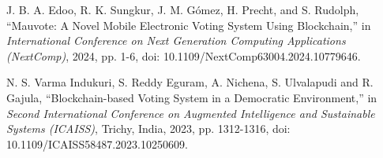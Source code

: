 \documentclass[conference]{IEEEtran}
\begin{document}
\begin{thebibliography}{8}
J. B. A. Edoo, R. K. Sungkur, J. M. Gómez, H. Precht, and S. Rudolph, ``Mauvote: A Novel Mobile Electronic Voting System Using Blockchain,'' in {\it International Conference on Next Generation Computing Applications (NextComp)}, 2024, pp. 1-6, doi: 10.1109/NextComp63004.2024.10779646.

N. S. Varma Indukuri, S. Reddy Eguram, A. Nichena, S. Ulvalapudi and R. Gajula, ``Blockchain-based Voting System in a Democratic Environment,'' in {\it Second International Conference on Augmented Intelligence and Sustainable Systems (ICAISS)}, Trichy, India, 2023, pp. 1312-1316, doi: 10.1109/ICAISS58487.2023.10250609.
\end{thebibliography}
\end{document}
